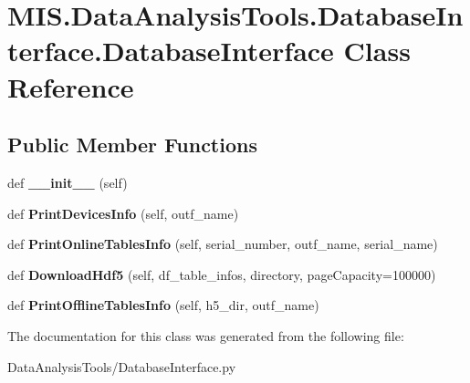 \hypertarget{classMIS_1_1DataAnalysisTools_1_1DatabaseInterface_1_1DatabaseInterface}{}\section{M\+I\+S.\+Data\+Analysis\+Tools.\+Database\+Interface.\+Database\+Interface Class Reference}
\label{classMIS_1_1DataAnalysisTools_1_1DatabaseInterface_1_1DatabaseInterface}
\subsection*{Public Member Functions}
\begin{DoxyCompactItemize}
\item 
\mbox{\label{classMIS_1_1DataAnalysisTools_1_1DatabaseInterface_1_1DatabaseInterface_af938d0c62fda857d87dbea4ea72cf97d}} 
def {\bfseries \+\_\+\+\_\+init\+\_\+\+\_\+} (self)
\item 
\mbox{\label{classMIS_1_1DataAnalysisTools_1_1DatabaseInterface_1_1DatabaseInterface_aec5280f9739805aa09ce48bea7a9d6a9}} 
def {\bfseries Print\+Devices\+Info} (self, outf\+\_\+name)
\item 
\mbox{\label{classMIS_1_1DataAnalysisTools_1_1DatabaseInterface_1_1DatabaseInterface_a72d230100239a3919076e8a907e652c1}} 
def {\bfseries Print\+Online\+Tables\+Info} (self, serial\+\_\+number, outf\+\_\+name, serial\+\_\+name)
\item 
\mbox{\label{classMIS_1_1DataAnalysisTools_1_1DatabaseInterface_1_1DatabaseInterface_a1d7938a40bee034685e4b6844d7b96c6}} 
def {\bfseries Download\+Hdf5} (self, df\+\_\+table\+\_\+infos, directory, page\+Capacity=100000)
\item 
\mbox{\label{classMIS_1_1DataAnalysisTools_1_1DatabaseInterface_1_1DatabaseInterface_a22bd9d1b0c792ad4c28d1825c93f36c4}} 
def {\bfseries Print\+Offline\+Tables\+Info} (self, h5\+\_\+dir, outf\+\_\+name)
\end{DoxyCompactItemize}


The documentation for this class was generated from the following file\+:\begin{DoxyCompactItemize}
\item 
Data\+Analysis\+Tools/Database\+Interface.\+py\end{DoxyCompactItemize}
